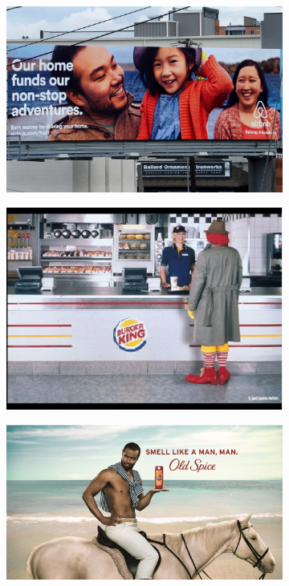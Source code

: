 \documentclass[hidelinks,11pt,a4paper]{report}
\begin{document}
\begin{figure}
    \centering
    \begin{subfigure}[b]{0.22\textwidth}
         \centering
         \includegraphics[width=\textwidth,scale=0.6]{images/airbnb.jpeg}
         \caption{}
         \label{fig:Airbib}
     \end{subfigure}
     \begin{subfigure}[b]{0.2\textwidth}
         \centering
         \includegraphics[width=\textwidth,scale=0.5]{images/Burger-King-vs-McDonalds-comparative-ad.png}
         \caption{}
         \label{fig:mcdonald}
     \end{subfigure}
     \begin{subfigure}[b]{0.27\textwidth}
         \centering
         \includegraphics[width=\textwidth,scale=1.0]{images/old-spice.jpeg}

\end{subfigure}
\end{figure}
\end{document}
